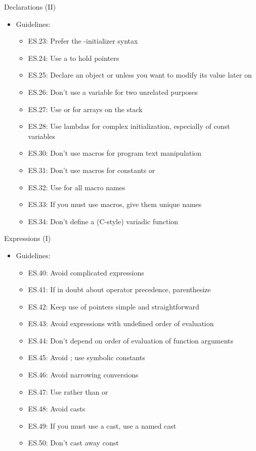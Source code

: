 \begin{frame}[t]{Declarations (II)}
\begin{itemize}
  \item Guidelines:
    \begin{itemize}
      \item ES.23: Prefer the {}-initializer syntax
      \item ES.24: Use a  to hold pointers
      \item ES.25: Declare an object  or  
            unless you want to modify its value later on
      \item ES.26: Don’t use a variable for two unrelated purposes
      \item ES.27: Use  or  for arrays on the stack
      \item ES.28: Use lambdas for complex initialization, especially of const variables
      \item ES.30: Don’t use macros for program text manipulation
      \item ES.31: Don’t use macros for constants or 
      \item ES.32: Use  for all macro names
      \item ES.33: If you must use macros, give them unique names
      \item ES.34: Don’t define a (C-style) variadic function
    \end{itemize}
\end{itemize}
\end{frame}

\begin{frame}[t]{Expressions (I)}
\begin{itemize}
  \item Guidelines:
    \begin{itemize}
      \item ES.40: Avoid complicated expressions
      \item ES.41: If in doubt about operator precedence, parenthesize
      \item ES.42: Keep use of pointers simple and straightforward
      \item ES.43: Avoid expressions with undefined order of evaluation
      \item ES.44: Don’t depend on order of evaluation of function arguments
      \item ES.45: Avoid ; use symbolic constants
      \item ES.46: Avoid narrowing conversions
      \item ES.47: Use  rather than  or 
      \item ES.48: Avoid casts
      \item ES.49: If you must use a cast, use a named cast
      \item ES.50: Don’t cast away const
    \end{itemize}
\end{itemize}
\end{frame}

